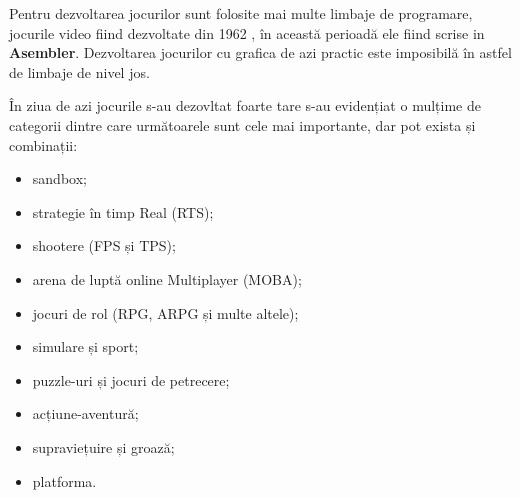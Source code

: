 Pentru dezvoltarea jocurilor sunt folosite mai multe limbaje de programare,
jocurile video fiind dezvoltate din 1962 \cite{FirstGame}, în această perioadă
ele fiind scrise in \textbf{Asembler}. Dezvoltarea jocurilor cu grafica de azi
practic este imposibilă în astfel de limbaje de nivel jos. 

În ziua de azi jocurile s-au dezovltat foarte tare s-au evidențiat o mulțime 
de categorii dintre care următoarele sunt cele mai importante, dar pot exista 
și combinații:
\begin{itemize}
    \item sandbox;
    \item strategie în timp Real (RTS);
    \item shootere (FPS și TPS);
    \item arena de luptă online Multiplayer (MOBA);
    \item jocuri de rol (RPG, ARPG și multe altele);
    \item simulare și sport;
    \item puzzle-uri și jocuri de petrecere;
    \item acțiune-aventură;
    \item supraviețuire și groază;
    \item platforma.
\end{itemize}
